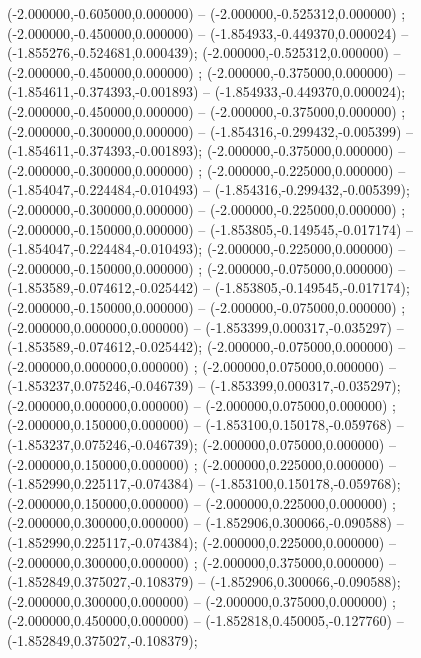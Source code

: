  (-2.000000,-0.605000,0.000000) -- (-2.000000,-0.525312,0.000000) ;
 (-2.000000,-0.450000,0.000000) -- (-1.854933,-0.449370,0.000024) -- (-1.855276,-0.524681,0.000439);
 (-2.000000,-0.525312,0.000000) -- (-2.000000,-0.450000,0.000000) ;
 (-2.000000,-0.375000,0.000000) -- (-1.854611,-0.374393,-0.001893) -- (-1.854933,-0.449370,0.000024);
 (-2.000000,-0.450000,0.000000) -- (-2.000000,-0.375000,0.000000) ;
 (-2.000000,-0.300000,0.000000) -- (-1.854316,-0.299432,-0.005399) -- (-1.854611,-0.374393,-0.001893);
 (-2.000000,-0.375000,0.000000) -- (-2.000000,-0.300000,0.000000) ;
 (-2.000000,-0.225000,0.000000) -- (-1.854047,-0.224484,-0.010493) -- (-1.854316,-0.299432,-0.005399);
 (-2.000000,-0.300000,0.000000) -- (-2.000000,-0.225000,0.000000) ;
 (-2.000000,-0.150000,0.000000) -- (-1.853805,-0.149545,-0.017174) -- (-1.854047,-0.224484,-0.010493);
 (-2.000000,-0.225000,0.000000) -- (-2.000000,-0.150000,0.000000) ;
 (-2.000000,-0.075000,0.000000) -- (-1.853589,-0.074612,-0.025442) -- (-1.853805,-0.149545,-0.017174);
 (-2.000000,-0.150000,0.000000) -- (-2.000000,-0.075000,0.000000) ;
 (-2.000000,0.000000,0.000000) -- (-1.853399,0.000317,-0.035297) -- (-1.853589,-0.074612,-0.025442);
 (-2.000000,-0.075000,0.000000) -- (-2.000000,0.000000,0.000000) ;
 (-2.000000,0.075000,0.000000) -- (-1.853237,0.075246,-0.046739) -- (-1.853399,0.000317,-0.035297);
 (-2.000000,0.000000,0.000000) -- (-2.000000,0.075000,0.000000) ;
 (-2.000000,0.150000,0.000000) -- (-1.853100,0.150178,-0.059768) -- (-1.853237,0.075246,-0.046739);
 (-2.000000,0.075000,0.000000) -- (-2.000000,0.150000,0.000000) ;
 (-2.000000,0.225000,0.000000) -- (-1.852990,0.225117,-0.074384) -- (-1.853100,0.150178,-0.059768);
 (-2.000000,0.150000,0.000000) -- (-2.000000,0.225000,0.000000) ;
 (-2.000000,0.300000,0.000000) -- (-1.852906,0.300066,-0.090588) -- (-1.852990,0.225117,-0.074384);
 (-2.000000,0.225000,0.000000) -- (-2.000000,0.300000,0.000000) ;
 (-2.000000,0.375000,0.000000) -- (-1.852849,0.375027,-0.108379) -- (-1.852906,0.300066,-0.090588);
 (-2.000000,0.300000,0.000000) -- (-2.000000,0.375000,0.000000) ;
 (-2.000000,0.450000,0.000000) -- (-1.852818,0.450005,-0.127760) -- (-1.852849,0.375027,-0.108379);

